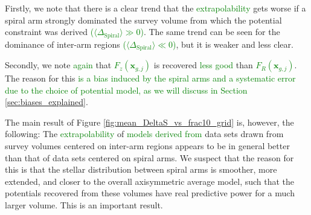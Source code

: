 \documentclass[iop,revtex4,numberedappendix,appendixfloats]{emulateapj}
\newcommand{\vect}[1]{\boldsymbol{#1}}
\newcommand{\NEW}[1]{\textcolor{Green}{#1}}
\newcommand{\OLD}[1]{}
\begin{document}
Firstly, we note that there is a clear trend that the \OLD{predictive power}\NEW{extrapolability} gets worse if a spiral arm strongly dominated the survey volume from which the potential constraint was derived \NEW{($\langle \Delta_\text{Spiral} \rangle \gg 0$)}. The same trend can be seen for the dominance of inter-arm regions \NEW{($\langle \Delta_\text{Spiral} \rangle \ll 0$)}, but it is weaker and less clear.

Secondly, we note \NEW{again} that \OLD{$F_z(g_j)$}\NEW{$F_z(\vect{x}_{g,j})$} is recovered \OLD{much worse}\NEW{less good} than \OLD{$F_R(g_j)$}\NEW{$F_R(\vect{x}_{g,j})$}. The reason for this \NEW{is a bias induced by the spiral arms and a systematic error due to the choice of potential model, as we will discuss in Section \ref{sec:biases_explained}}\OLD{was already laid out in Section \ref{sec:forces_bias})}. 

The main result of Figure \ref{fig:mean_DeltaS_vs_frac10_grid} is, however, the following: The \OLD{predictive power}\NEW{extrapolability} of \NEW{models derived from} data sets drawn from survey volumes centered on inter-arm regions appears to be in general \OLD{much} better than that of data sets centered on spiral arms. We suspect that the reason for this is that the stellar distribution between spiral arms is smoother, more extended, and closer to the overall axisymmetric average model, such that the potentials recovered from these volumes have real predictive power for a much larger volume. This is an important result.
\end{document}

